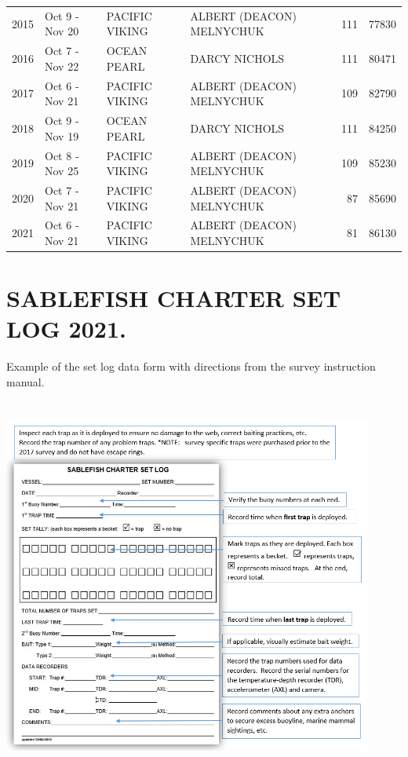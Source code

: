 \documentclass[12pt]{article}\usepackage[]{graphicx}\usepackage[]{color}
\begin{document}
\begin{appendices}
\begin{longtable}{rlllrr}
2015 & Oct  9  - Nov 20 & PACIFIC VIKING & ALBERT (DEACON) MELNYCHUK & 111 & 77830\\
2016 & Oct  7  - Nov 22 & OCEAN PEARL & DARCY NICHOLS & 111 & 80471\\
2017 & Oct  6  - Nov 21 & PACIFIC VIKING & ALBERT (DEACON) MELNYCHUK & 109 & 82790\\
2018 & Oct  9  - Nov 19 & OCEAN PEARL & DARCY NICHOLS & 111 & 84250\\
2019 & Oct  8  - Nov 25 & PACIFIC VIKING & ALBERT (DEACON) MELNYCHUK & 109 & 85230\\
2020 & Oct  7  - Nov 21 & PACIFIC VIKING & ALBERT (DEACON) MELNYCHUK & 87 & 85690\\
2021 & Oct  6  - Nov 21 & PACIFIC VIKING & ALBERT (DEACON) MELNYCHUK & 81 & 86130\\
\bottomrule
\end{longtable}
\endgroup{}
\clearpage

\section{SABLEFISH CHARTER SET LOG 2021.}
\label{app:second-appendix}

Example of the set log data form with directions from the survey instruction manual.
\begin{flushleft}\includegraphics[width=460px,height=466px]{figures/AppendixB} \end{flushleft}
\clearpage


\end{appendices}
\end{document}
